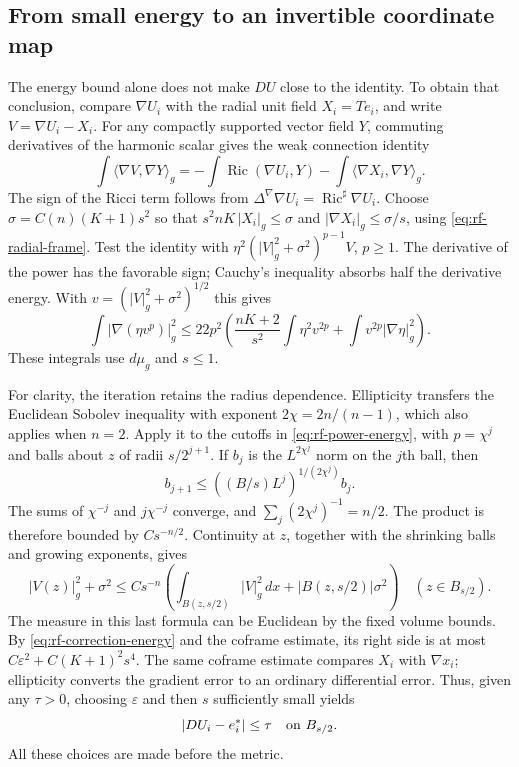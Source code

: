 \subsection{From small energy to an invertible coordinate map}

The energy bound alone does not make $DU$ close to the identity.
To obtain that conclusion, compare $\nabla U_i$ with the radial
unit field $X_i=T e_i$, and write $V=\nabla U_i-X_i$.
For any compactly supported vector field $Y$, commuting derivatives
of the harmonic scalar gives the weak connection identity
\[
 \int\langle\nabla V,\nabla Y\rangle_g
 =-\int\operatorname{Ric}(\nabla U_i,Y)
   -\int\langle\nabla X_i,\nabla Y\rangle_g.
\]
The sign of the Ricci term follows from
$\Delta^\nabla\nabla U_i=\operatorname{Ric}^{\sharp}\nabla U_i$.
Choose $\sigma=C(n)(K+1)s^2$ so that
$s^2 nK\,|X_i|_g\leq\sigma$ and
$|\nabla X_i|_g\leq\sigma/s$, using
\eqref{eq:rf-radial-frame}.  Test the identity with
$\eta^2(|V|_g^2+\sigma^2)^{p-1}V$, $p\geq1$.
The derivative of the power has the favorable sign; Cauchy's
inequality absorbs half the derivative energy.  With
$v=(|V|_g^2+\sigma^2)^{1/2}$ this gives
\begin{equation}\label{eq:rf-power-energy}
 \int|\nabla(\eta v^p)|_g^2
 \leq22p^2\left(
    \frac{nK+2}{s^2}\int\eta^2v^{2p}
       +\int v^{2p}|\nabla\eta|_g^2\right).
\end{equation}
These integrals use $d\mu_g$ and $s\leq1$.

For clarity, the iteration retains the radius dependence.
Ellipticity transfers the Euclidean Sobolev inequality with
exponent $2\chi=2n/(n-1)$, which also applies when $n=2$.
Apply it to the cutoffs in \eqref{eq:rf-power-energy}, with
$p=\chi^j$ and balls about $z$ of radii $s/2^{j+1}$.
If $b_j$ is the $L^{2\chi^j}$ norm on the $j$th ball, then
\[
 b_{j+1}\leq((B/s)L^j)^{1/(2\chi^j)}b_j.
\]
The sums of $\chi^{-j}$ and $j\chi^{-j}$ converge, and
$\sum_j(2\chi^j)^{-1}=n/2$.  The product is therefore bounded
by $Cs^{-n/2}$.  Continuity at $z$, together with the shrinking
balls and growing exponents, gives
\[
 |V(z)|_g^2+\sigma^2
 \leq Cs^{-n}\left(
       \int_{B(z,s/2)}|V|_g^2\,dx
           +|B(z,s/2)|\sigma^2\right)
       \quad(z\in B_{s/2}).
\]
The measure in this last formula can be Euclidean by the fixed
volume bounds.  By \eqref{eq:rf-correction-energy} and the coframe
estimate, its right side is at most
$C\varepsilon^2+C(K+1)^2s^4$.
The same coframe estimate compares $X_i$ with $\nabla x_i$;
ellipticity converts the gradient error to an ordinary differential
error.  Thus, given any $\tau>0$, choosing $\varepsilon$ and then
$s$ sufficiently small yields
\[
 |DU_i-e_i^*|\leq\tau\quad\hbox{on }B_{s/2}.
\]
All these choices are made before the metric.

